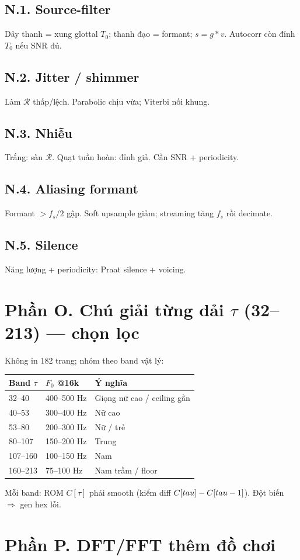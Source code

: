\subsection*{N.1. Source-filter}
Dây thanh = xung glottal $T_0$; thanh đạo = formant; $s=g*v$. Autocorr còn đỉnh $T_0$ nếu SNR đủ.
\subsection*{N.2. Jitter / shimmer}
Làm $\mathcal{R}$ thấp/lệch. Parabolic chịu vừa; Viterbi nối khung.
\subsection*{N.3. Nhiễu}
Trắng: sàn $\mathcal{R}$. Quạt tuần hoàn: đỉnh giả. Cần SNR + periodicity.
\subsection*{N.4. Aliasing formant}
Formant $>f_s/2$ gập. Soft upsample giảm; streaming tăng $f_s$ rồi decimate.
\subsection*{N.5. Silence}
Năng lượng + periodicity: Praat silence + voicing.
\newpage\section*{Phần O. Chú giải từng dải $\tau$ (32--213) --- chọn lọc}
Không in 182 trang; nhóm theo band vật lý:
\begin{center}\small\begin{tabular}{@{}llp{6cm}@{}}
\toprule Band $\tau$ & $F_0$ @16k & Ý nghĩa \\ \midrule
32--40 & 400--500 Hz & Giọng nữ cao / ceiling gần \\
40--53 & 300--400 Hz & Nữ cao \\
53--80 & 200--300 Hz & Nữ / trẻ \\
80--107 & 150--200 Hz & Trung \\
107--160 & 100--150 Hz & Nam \\
160--213 & 75--100 Hz & Nam trầm / floor \\
\bottomrule\end{tabular}\end{center}
Mỗi band: ROM $C[\tau]$ phải smooth (kiểm diff $C[\\tau]-C[\\tau-1]$). Đột biến $\Rightarrow$ gen hex lỗi.
\newpage\section*{Phần P. DFT/FFT thêm đồ chơi}
